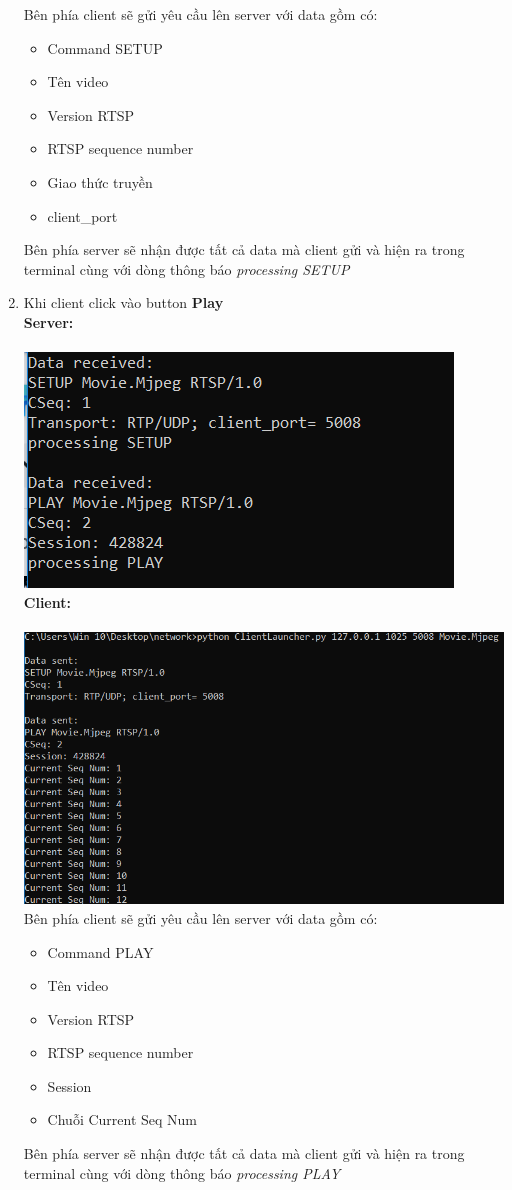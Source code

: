 \documentclass[12pt,a4paper]{article}
\begin{document}
\begin{enumerate}
Bên phía client sẽ gửi yêu cầu lên server với data gồm có:
\begin{itemize}
\item Command SETUP
\item Tên video
\item Version RTSP
\item RTSP sequence number
\item Giao thức truyền
\item client\_port
\end{itemize}
Bên phía server sẽ nhận được tất cả data mà client gửi và hiện ra trong terminal cùng với dòng thông báo  \textit{processing SETUP}
\item Khi client click vào button \textbf{Play} \\
\textbf{Server:} \\ \\
\includegraphics[scale=0.5]{h6.png}  \\
\textbf{Client:} \\ \\
\includegraphics[scale=0.5]{h7.png}  \\
Bên phía client sẽ gửi yêu cầu lên server với data gồm có:
\begin{itemize}
\item Command PLAY  
\item Tên video
\item Version RTSP
\item RTSP sequence number
\item Session 
\item Chuỗi Current Seq Num
\end{itemize}
Bên phía server sẽ nhận được tất cả data mà client gửi và hiện ra trong terminal cùng với dòng thông báo  \textit{processing PLAY}


\end{enumerate}
\end{document}
